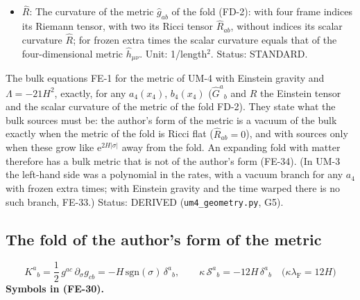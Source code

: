 \documentclass[
  10pt,
]{article}
\begin{document}
\begin{itemize}
  components along the four observable directions, which for frozen
  extra times are those of the Einstein tensor of the four-dimensional
  metric \(\hat h_{\mu\nu}\). Unit: 1/length\(^2\). Status: STANDARD.
\item
  \(\hat R\): The curvature of the metric \(\hat g_{ab}\) of the fold
  (FD-2): with four frame indices its Riemann tensor, with two its Ricci
  tensor \(\hat R_{ab}\), without indices its scalar curvature
  \(\hat R\); for frozen extra times the scalar curvature equals that of
  the four-dimensional metric \(\hat h_{\mu\nu}\). Unit: 1/length\(^2\).
  Status: STANDARD.
\end{itemize}

The bulk equations FE-1 for the metric of UM-4 with Einstein gravity and
\(\Lambda = -21H^2\), exactly, for any \(a_4(x_4)\), \(b_4(x_4)\)
(\(\hat G^a{}_b\) and \(\hat R\) the Einstein tensor and the scalar
curvature of the metric of the fold FD-2). They state what the bulk
sources must be: the author's form of the metric is a vacuum of the bulk
exactly when the metric of the fold is Ricci flat (\(\hat R_{ab} = 0\)),
and with sources only when these grow like
\(\mathrm{e}^{2H\lvert\sigma\rvert}\) away from the fold. An expanding
fold with matter therefore has a bulk metric that is not of the author's
form (FE-34). (In UM-3 the left-hand side was a polynomial in the rates,
with a vacuum branch for any \(a_4\) with frozen extra times; with
Einstein gravity and the time warped there is no such branch, FE-33.)
Status: DERIVED (\texttt{um4\_geometry.py}, G5).

\hypertarget{the-fold-of-the-authors-form-of-the-metric}{%
\subsection{The fold of the author's form of the
metric}\label{the-fold-of-the-authors-form-of-the-metric}}

\[
K^a{}_b = \frac12\,g^{ac}\,\partial_\sigma g_{cb} = -H\,\mathrm{sgn}(\sigma)\,\delta^a{}_b,\qquad
\kappa\,\mathcal{S}^a{}_b = -12H\,\delta^a{}_b\quad\big(\kappa\lambda_{\mathrm{F}} = 12H\big) \tag{FE-30}
\] \textbf{Symbols in (FE-30).}
\end{document}
